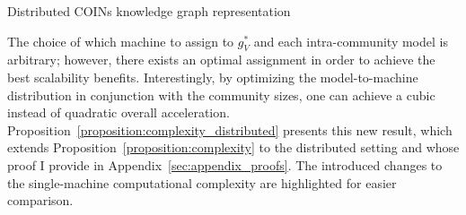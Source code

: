 \begin{algorithm}[ht!]
\caption{Distributed COINs knowledge graph representation}
\label{algorithm:coins_distributed}
\begin{algorithmic}[1]
\ELSE
{}
\ENDIF
{}
\end{algorithmic}
\end{algorithm} 
The choice of which machine to assign to $g^*_V$ and each intra-community model is arbitrary; however, there exists an optimal assignment in order to achieve the best scalability benefits. Interestingly, by optimizing the model-to-machine distribution in conjunction with the community sizes, one can achieve a cubic instead of quadratic overall acceleration. Proposition~\ref{proposition:complexity_distributed} presents this new result, which extends Proposition~\ref{proposition:complexity} to the distributed setting and whose proof I provide in Appendix~\ref{sec:appendix_proofs}. The introduced changes to the single-machine computational complexity are highlighted for easier comparison.


